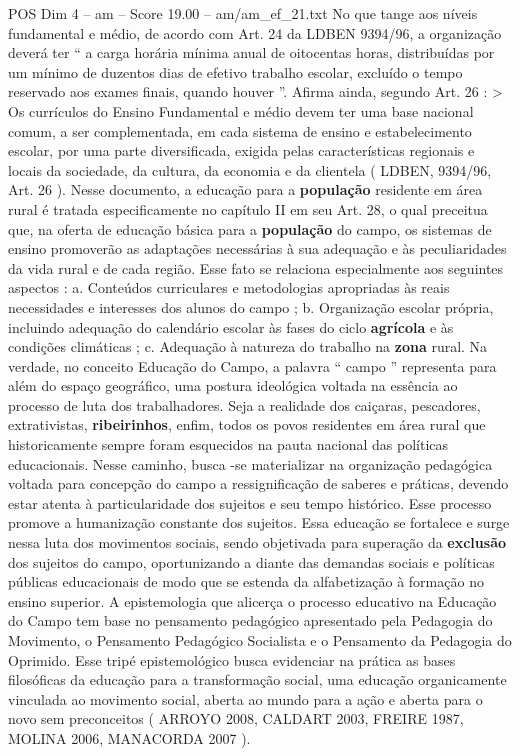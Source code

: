 \begin{textsample}{POS Dim 4 – am – Score 19.00 – am/am\_ef\_21.txt}
No que tange aos níveis fundamental e médio, de acordo com Art. 24 da LDBEN 9394/96, a organização deverá ter “ a carga horária mínima anual de oitocentas horas, distribuídas por um mínimo de duzentos dias de efetivo trabalho escolar, excluído o tempo reservado aos exames finais, quando houver ”.
Afirma ainda, segundo Art. 26 : > Os currículos do Ensino Fundamental e médio devem ter uma base nacional comum, a ser complementada, em cada sistema de ensino e estabelecimento escolar, por uma parte diversificada, exigida pelas características regionais e locais da sociedade, da cultura, da economia e da clientela ( LDBEN, 9394/96, Art. 26 ).
Nesse documento, a educação para a \textbf{população} residente em área rural é tratada especificamente no capítulo II em seu Art. 28, o qual preceitua que, na oferta de educação básica para a \textbf{população} do campo, os sistemas de ensino promoverão as adaptações necessárias à sua adequação e às peculiaridades da vida rural e de cada região.
Esse fato se relaciona especialmente aos seguintes aspectos : a.
Conteúdos curriculares e metodologias apropriadas às reais necessidades e interesses dos alunos do campo ; b.
Organização escolar própria, incluindo adequação do calendário escolar às fases do ciclo \textbf{agrícola} e às condições climáticas ; c.
Adequação à natureza do trabalho na \textbf{zona} rural.
Na verdade, no conceito Educação do Campo, a palavra “ campo ” representa para além do espaço geográfico, uma postura ideológica voltada na essência ao processo de luta dos trabalhadores.
Seja a realidade dos caiçaras, pescadores, extrativistas, \textbf{ribeirinhos}, enfim, todos os povos residentes em área rural que historicamente sempre foram esquecidos na pauta nacional das políticas educacionais.
Nesse caminho, busca -se materializar na organização pedagógica voltada para concepção do campo a ressignificação de saberes e práticas, devendo estar atenta à particularidade dos sujeitos e seu tempo histórico.
Esse processo promove a humanização constante dos sujeitos.
Essa educação se fortalece e surge nessa luta dos movimentos sociais, sendo objetivada para superação da \textbf{exclusão} dos sujeitos do campo, oportunizando a diante das demandas sociais e políticas públicas educacionais de modo que se estenda da alfabetização à formação no ensino superior.
A epistemologia que alicerça o processo educativo na Educação do Campo tem base no pensamento pedagógico apresentado pela Pedagogia do Movimento, o Pensamento Pedagógico Socialista e o Pensamento da Pedagogia do Oprimido.
Esse tripé epistemológico busca evidenciar na prática as bases filosóficas da educação para a transformação social, uma educação organicamente vinculada ao movimento social, aberta ao mundo para a ação e aberta para o novo sem preconceitos ( ARROYO 2008, CALDART 2003, FREIRE 1987, MOLINA 2006, MANACORDA 2007 ).

\end{textsample}
